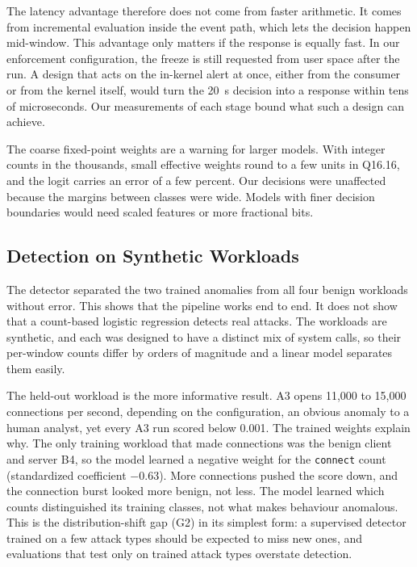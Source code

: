 The latency advantage therefore does not come from faster arithmetic. It comes from incremental evaluation inside the event path, which lets the decision happen mid-window. This advantage only matters if the response is equally fast. In our enforcement configuration, the freeze is still requested from user space after the run. A design that acts on the in-kernel alert at once, either from the consumer or from the kernel itself, would turn the 20~\textmu s decision into a response within tens of microseconds. Our measurements of each stage bound what such a design can achieve.

The coarse fixed-point weights are a warning for larger models. With integer counts in the thousands, small effective weights round to a few units in Q16.16, and the logit carries an error of a few percent. Our decisions were unaffected because the margins between classes were wide. Models with finer decision boundaries would need scaled features or more fractional bits.

\subsection{Detection on Synthetic Workloads}

The detector separated the two trained anomalies from all four benign workloads without error. This shows that the pipeline works end to end. It does not show that a count-based logistic regression detects real attacks. The workloads are synthetic, and each was designed to have a distinct mix of system calls, so their per-window counts differ by orders of magnitude and a linear model separates them easily.

The held-out workload is the more informative result. A3 opens 11{,}000 to 15{,}000 connections per second, depending on the configuration, an obvious anomaly to a human analyst, yet every A3 run scored below 0.001. The trained weights explain why. The only training workload that made connections was the benign client and server B4, so the model learned a negative weight for the \texttt{connect} count (standardized coefficient $-0.63$). More connections pushed the score down, and the connection burst looked more benign, not less. The model learned which counts distinguished its training classes, not what makes behaviour anomalous. This is the distribution-shift gap (G2) in its simplest form: a supervised detector trained on a few attack types should be expected to miss new ones, and evaluations that test only on trained attack types overstate detection.

